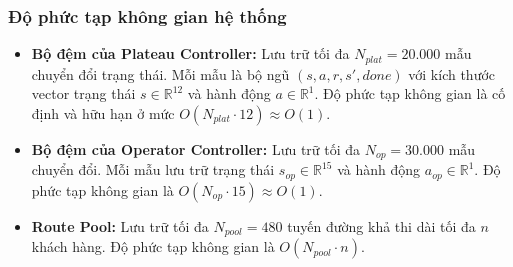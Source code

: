 \documentclass[13pt,a4paper]{extarticle}
\begin{document}
\subsubsection{Độ phức tạp không gian hệ thống}
\begin{itemize}[leftmargin=1.2cm]
  \item \textbf{Bộ đệm của Plateau Controller:} Lưu trữ tối đa $N_{plat} = 20.000$ mẫu chuyển đổi trạng thái. Mỗi mẫu là bộ ngũ $(s, a, r, s', done)$ với kích thước vector trạng thái $s \in \mathbb{R}^{12}$ và hành động $a \in \mathbb{R}^1$. Độ phức tạp không gian là cố định và hữu hạn ở mức $O(N_{plat} \cdot 12) \approx O(1)$.
  \item \textbf{Bộ đệm của Operator Controller:} Lưu trữ tối đa $N_{op} = 30.000$ mẫu chuyển đổi. Mỗi mẫu lưu trữ trạng thái $s_{op} \in \mathbb{R}^{15}$ và hành động $a_{op} \in \mathbb{R}^1$. Độ phức tạp không gian là $O(N_{op} \cdot 15) \approx O(1)$.
  \item \textbf{Route Pool:} Lưu trữ tối đa $N_{pool} = 480$ tuyến đường khả thi dài tối đa $n$ khách hàng. Độ phức tạp không gian là $O(N_{pool} \cdot n)$.
\end{itemize}
\end{document}
